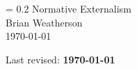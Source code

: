 \makeglossaries

  \renewcommand*{\glossentry}[2]{%
    \item[\glsentryitem{#1}%
          \glstarget{#1}{\glossentryname{#1}}]  
       \glossentrydesc{#1}\glspostdescription\space ({#2})}



\pagestyle{plain}
\fancyhf{}
\markboth{ }{}

\newlength{\drop}%
{\begingroup%
\drop = 0.2\textheight
\centering
\vfill
{\Huge Normative Externalism}\\[\baselineskip]
{\large Brian Weatherson}\\[0.5\drop]
\vfill
{\large\scshape \today}\par
\vfill\null
\endgroup}


\setcounter{tocdepth}{1}

\tableofcontents 

\vspace{12pt}

\noindent Last revised: \textbf{\today}

\newpage
       
\printglossary[title=List of Examples,toctitle=List of Examples]


\newpage


\fancyhf{}
\fancyhead[CE]{\textit \leftmark}
\fancyhead[LE]{\thepage}
\fancyhead[CO]{\textit \rightmark}
\fancyhead[RO]{\thepage}